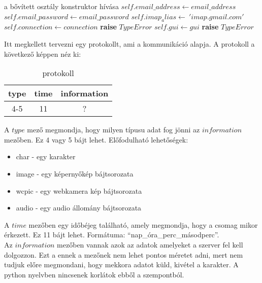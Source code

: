 \documentclass[a4paper, 11pt]{article}
\begin{document}
\begin{algorithmic}[H]
	\State a bővített osztály konstruktor hívása
	\State $self.email\_address \gets email\_address$
	\State $self.email\_password \gets email\_password$
	\State $self.imap_alias \gets\ 'imap.gmail.com'$
		\State $self.connection \gets connection$
	\Else
		\State \textbf{raise} $TypeError$
	\EndIf
		\State $self.gui \gets gui$
	\Else
		\State \textbf{raise} $TypeError$
	\EndIf
\EndFunction
\end{algorithmic}


Itt megkellett tervezni egy protokollt, ami a kommunikáció alapja. A protokoll a következő képpen néz ki:
\begin{table}[H]
\centering
\label{tab:protocol}
\caption{protokoll}
\begin{tabular}{|c|c|c|}
\hline
\textbf{type} & \textbf{time} & \textbf{information} \\
\hline
4-5 & 11 & ? \\
\hline
\end{tabular}
\end{table}
A $type$ mező megmondja, hogy milyen típusu adat fog jönni az $information$ mezőben. Ez 4 vagy 5 bájt lehet. Előfodulható lehetőségek:
\begin{itemize}
\item char - egy karakter
\item image - egy képernyőkép bájtsorozata
\item wcpic - egy webkamera kép bájtsorozata
\item audio - egy audio állomány bájtsorozata
\end{itemize}
A $time$ mezőben egy időbéjeg található, amely megmondja, hogy a csomag mikor érkezett. Ez 11 bájt lehet. Formátuma: ``nap\_óra\_perc\_másodperc''.\\
Az $information$ mezőben vannak azok az adatok amelyeket a szerver fel kell dolgozzon. Ezt a ennek a mezőnek nem lehet pontos méretet adni, mert nem tudjuk előre megmondani, hogy mekkora adatot küld, kivétel a karakter. A python nyelvben nincsenek korlátok ebből a szempontból.
\end{document}
